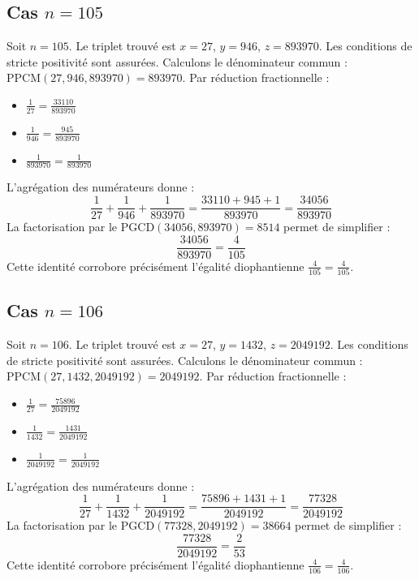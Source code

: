 \documentclass[11pt,a4paper]{article}
\begin{document}
\subsection{Cas $n = 105$}
Soit $n = 105$. Le triplet trouvé est $x = 27$, $y = 946$, $z = 893970$.
Les conditions de stricte positivité sont assurées.
Calculons le dénominateur commun : $\text{PPCM}(27, 946, 893970) = 893970$.
Par réduction fractionnelle :
\begin{itemize}
    \item $\frac{1}{27} = \frac{33110}{893970}$
    \item $\frac{1}{946} = \frac{945}{893970}$
    \item $\frac{1}{893970} = \frac{1}{893970}$
\end{itemize}
L'agrégation des numérateurs donne :
$$ \frac{1}{27} + \frac{1}{946} + \frac{1}{893970} = \frac{33110 + 945 + 1}{893970} = \frac{34056}{893970} $$
La factorisation par le $\text{PGCD}(34056, 893970) = 8514$ permet de simplifier :
$$ \frac{34056}{893970} = \frac{4}{105} $$
Cette identité corrobore précisément l'égalité diophantienne $\frac{4}{105} = \frac{4}{105}$.

\subsection{Cas $n = 106$}
Soit $n = 106$. Le triplet trouvé est $x = 27$, $y = 1432$, $z = 2049192$.
Les conditions de stricte positivité sont assurées.
Calculons le dénominateur commun : $\text{PPCM}(27, 1432, 2049192) = 2049192$.
Par réduction fractionnelle :
\begin{itemize}
    \item $\frac{1}{27} = \frac{75896}{2049192}$
    \item $\frac{1}{1432} = \frac{1431}{2049192}$
    \item $\frac{1}{2049192} = \frac{1}{2049192}$
\end{itemize}
L'agrégation des numérateurs donne :
$$ \frac{1}{27} + \frac{1}{1432} + \frac{1}{2049192} = \frac{75896 + 1431 + 1}{2049192} = \frac{77328}{2049192} $$
La factorisation par le $\text{PGCD}(77328, 2049192) = 38664$ permet de simplifier :
$$ \frac{77328}{2049192} = \frac{2}{53} $$
Cette identité corrobore précisément l'égalité diophantienne $\frac{4}{106} = \frac{4}{106}$.
\end{document}
